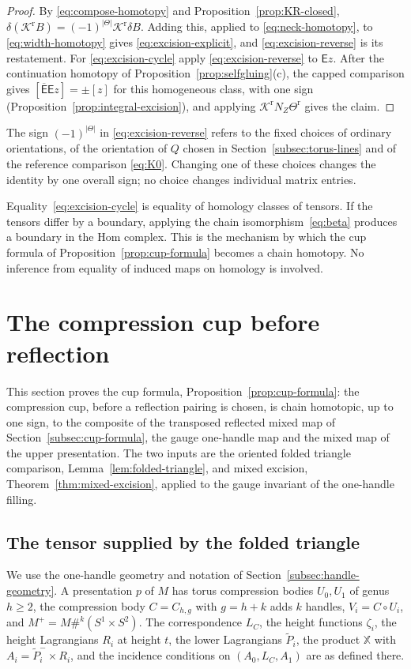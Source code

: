 \documentclass[11pt]{amsart}
\theoremstyle{definition}
\theoremstyle{remark}
\theoremstyle{plain}
\numberwithin{equation}{section}
\begin{document}
\begin{proof}
By \eqref{eq:compose-homotopy} and Proposition~\ref{prop:KR-closed},
$\delta(\mathcal K^{\mathrm r}B)=(-1)^{|\Theta|}\mathcal K^{\mathrm r}\delta B$. Adding this, applied
to \eqref{eq:neck-homotopy}, to \eqref{eq:width-homotopy} gives
\eqref{eq:excision-explicit}, and \eqref{eq:excision-reverse} is its
restatement. For \eqref{eq:excision-cycle} apply
\eqref{eq:excision-reverse} to $\mathsf Ez$. After the continuation
homotopy of Proposition~\ref{prop:selfgluing}(c), the capped comparison
gives $[\overline{\mathsf E}\mathsf Ez]=\pm[z]$ for this homogeneous
class, with one sign (Proposition~\ref{prop:integral-excision}), and applying
$\mathcal K^{\mathrm r}N_Z\Theta^{\mathrm r}$ gives the claim.
\end{proof}

The sign $(-1)^{|\Theta|}$ in \eqref{eq:excision-reverse} refers to the fixed
choices of ordinary orientations, of the orientation of $Q$ chosen in
Section~\ref{subsec:torus-lines} and of
the reference comparison \eqref{eq:K0}. Changing one of these choices
changes the identity by one overall sign; no choice changes individual
matrix entries.

Equality~\eqref{eq:excision-cycle} is equality of homology classes of
tensors. If the tensors differ by a boundary, applying the chain
isomorphism~\eqref{eq:beta} produces a boundary in the Hom complex.
This is the mechanism by which the cup formula of Proposition~\ref{prop:cup-formula} becomes a chain homotopy. No inference from equality of induced maps on
homology is involved.

\section{The compression cup before reflection}\label{sec:cup}

This section proves the cup formula, Proposition~\ref{prop:cup-formula}:
the compression cup, before a reflection pairing is chosen, is
chain homotopic, up to one sign, to the composite of the transposed
reflected mixed map of Section~\ref{subsec:cup-formula}, the gauge
one-handle map and the mixed map of the upper presentation. The two
inputs are
the oriented folded triangle comparison, Lemma~\ref{lem:folded-triangle},
and mixed excision, Theorem~\ref{thm:mixed-excision}, applied to the
gauge invariant of the one-handle filling.

\subsection{The tensor supplied by the folded triangle}
We use the one-handle geometry and notation of
Section~\ref{subsec:handle-geometry}. A presentation $p$ of $M$ has
torus compression bodies $U_0,U_1$ of genus $h\ge2$, the compression
body $C=C_{h,g}$ with $g=h+k$ adds $k$ handles, $V_i=C\circ U_i$, and
$M^+=M\#^k(S^1\times S^2)$. The correspondence $L_C$, the height
functions $\zeta_i$, the height Lagrangians $R_i$ at height $t$, the
lower Lagrangians $\widetilde P_i$, the product $\mathbb X$ with
$A_i=\widetilde P_i^-\times R_i$, and the incidence conditions on
$(A_0,L_C,A_1)$ are as defined there.
\end{document}
